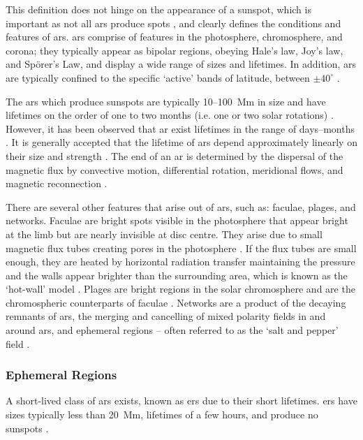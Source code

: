 This definition does not hinge on the appearance of a sunspot, which is important as not all \glspl{ar} produce spots \citep{van_driel-gesztelyi_evolution_2015}, and clearly defines the conditions and features of \glspl{ar}. \glspl{ar} comprise of features in the photosphere, chromosphere, and corona; they typically appear as bipolar regions, obeying Hale's law, Joy's law, and Sp\"{o}rer’s Law, and display a wide range of sizes and lifetimes. In addition, \glspl{ar} are typically confined to the specific `active' bands of latitude, between $\pm40^{\circ}$ \citep{harvey_solar_2001}.

The \glspl{ar} which produce sunspots are typically 10--100~Mm in size and have lifetimes on the order of one to two months (i.e. one or two solar rotations) \citep{canfield_solar_2001}. However, it has been observed that \gls{ar} exist lifetimes in the range of days--months \citep{schrijver_solar_2008}. It is generally accepted that the lifetime of \glspl{ar} depend approximately linearly on their size and strength \citep{canfield_solar_2001, schrijver_solar_2008}. The end of an \gls{ar} is determined by the dispersal of the magnetic flux by convective motion, differential rotation, meridional flows, and magnetic reconnection \citep{canfield_solar_2001}.


There are several other features that arise out of \glspl{ar}, such as: faculae, plages, and networks. Faculae are bright spots visible in the photosphere that appear bright at the limb but are nearly invisible at disc centre. They arise due to small magnetic flux tubes creating pores in the photosphere \citep{solovev_structure_2019}. If the flux tubes are small enough, they are heated by horizontal radiation transfer maintaining the pressure and the walls appear brighter than the surrounding area, which is known as the `hot-wall' model \citep{spruit_pressure_1976, keller_origin_2004}. Plages are bright regions in the solar chromosphere and are the chromospheric counterparts of faculae \citep{pillet_active_1997}. Networks are a product of the decaying remnants of \glspl{ar}, the merging and cancelling of mixed polarity fields in and around \glspl{ar}, and ephemeral regions -- often referred to as the `salt and pepper' field \citep{martin_identification_1988}.


\subsubsection*{Ephemeral Regions}

A short-lived class of \glspl{ar} exists, known as \glspl{er} due to their short lifetimes.  \glspl{er} have sizes typically less than 20~Mm, lifetimes of a few hours, and produce no sunspots \citep{harvey_solar_2001}.

